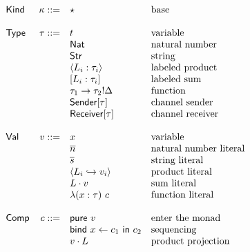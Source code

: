 \documentclass[12pt]{article}
\begin{document}
\[
\begin{array}{l r l l}
\textsf{Kind}   & \kappa ::= & \star                             & \text{base} \\
\\
\textsf{Type}   &   \tau ::= & t                                 & \text{variable} \\
                &            & \textsf{Nat}                      & \text{natural number} \\
                &            & \textsf{Str}                      & \text{string} \\
                &            & \langle L_i : \tau_i \rangle      & \text{labeled product} \\
                &            & [ L_i : \tau_i ]                  & \text{labeled sum} \\
                &            & \tau_1 \rightarrow \tau_2!\Delta  & \text{function} \\
                &            & \textsf{Sender}[\tau]             & \text{channel sender} \\
                &            & \textsf{Receiver}[\tau]           & \text{channel receiver} \\
\\
\textsf{Val}    &      v ::= & x                                 & \text{variable} \\
                &            & \overline{n}                      & \text{natural number literal} \\
                &            & \overline{s}                      & \text{string literal} \\
                &            & \langle
                               L_i \hookrightarrow v_i
                               \rangle                           & \text{product literal} \\
                &            & L \cdot v                         & \text{sum literal} \\
                &            & \lambda (x : \tau) \ c            & \text{function literal} \\
\\
\textsf{Comp}   &      c ::= & \textsf{pure} \ v                 & \text{enter the monad} \\
                &            & \textsf{bind} \ x \leftarrow c_1
                               \ \textsf{in} \ c_2               & \text{sequencing} \\
                &            & v \cdot L                         & \text{product projection} \\

\end{array}\]
\end{document}

